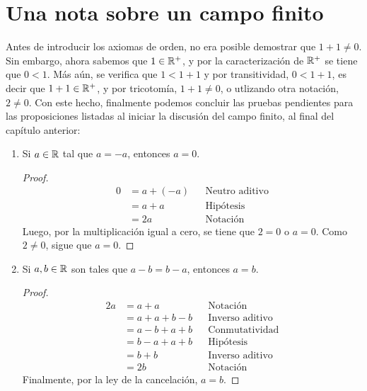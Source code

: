 \clearpage
\pagebreak

\section*{Una nota sobre un campo finito}

Antes de introducir los axiomas de orden, no era posible demostrar que $1+1\neq 0$. Sin embargo, ahora sabemos que $1\in \mathbb{R}^+$, y por la caracterización de $\mathbb{R}^+$ se tiene que $0<1$. Más aún, se verifica que $1<1+1$ y por transitividad, $0<1+1$, es decir que $1+1\in \mathbb{R}^+$, y por tricotomía, $1+1\neq 0$, o utlizando otra notación, $2\neq 0$. Con este hecho, finalmente podemos concluir las pruebas pendientes para las proposiciones listadas al iniciar la discusión del campo finito, al final del capítulo anterior:
\begin{enumerate}[label=\roman*)]
  \item Si $a\in \mathbb{R}$ tal que $a=-a$, entonces $a=0$.
  \begin{proof}\leavevmode
    \begin{align*}
      0 &= a + (-a) && \text{Neutro aditivo}\\
      &= a + a && \text{Hipótesis}\\
      &= 2a && \text{Notación}
    \end{align*}
    Luego, por la multiplicación igual a cero, se tiene que $2=0$ o $a=0$. Como $2\neq 0$, sigue que $a=0$.
  \end{proof}
  \item Si $a,b\in \mathbb{R}$ son tales que $a-b=b-a$, entonces $a=b$.
  \begin{proof}\leavevmode
    \begin{align*}
      2a %
      &= a + a && \text{Notación}\\
      &= a+a+b-b && \text{Inverso aditivo}\\
      &= a-b+a+b && \text{Conmutatividad}\\
      &= b-a +a +b && \text{Hipótesis}\\
      &= b+b && \text{Inverso aditivo}\\
      &= 2b && \text{Notación}
     \end{align*}
     Finalmente, por la ley de la cancelación, $a=b$.
  \end{proof}
\end{enumerate}